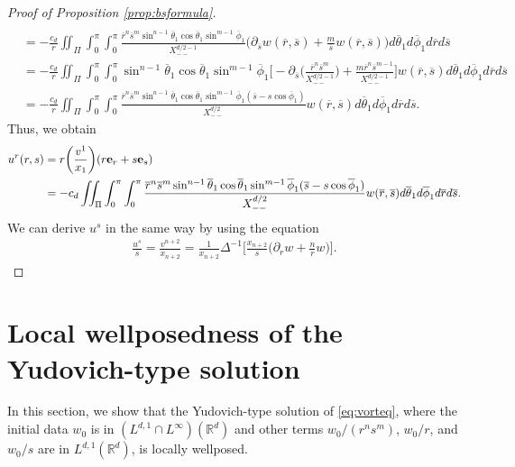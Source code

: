 \documentclass[11pt]{amsart}
\theoremstyle{definition}
\theoremstyle{remark}
\numberwithin{equation}{section}
\numberwithin{equation}{section}
\newcommand{\br}[1]{\overline{#1}}
\newcommand{\lap}{\Delta}
\newcommand{\rd}{\partial}
\newcommand{\0}{\emptyset}
\newcommand{\ift}{\infty}
\newcommand{\tht}{\theta}
\newcommand{\bfe}{{\bf e}}
\newcommand{\bbR}{\mathbb R}
\begin{document}
\begin{proof}[Proof of Proposition \ref{prop:bsformula}]
\begin{equation}
\begin{aligned}
				\\
				&=-\frac{c_{d}}{r}\iint_{\Pi}\int_{0}^{\pi}\int_{0}^{\pi}\frac{\br{r}^{n}\br{s}^{m}\sin^{n-1}\br{\tht}_{1}\cos\br{\tht}_{1}\sin^{m-1}\br{\phi}_{1}%
				}{X_{--}^{d/2-1}}\bigg(\rd_{\br{s}}w(\br{r},\br{s})+\frac{m}{\br{s}}w(\br{r},\br{s})\bigg)d\br{\tht}_{1}d\br{\phi}_{1}d\br{r}d\br{s}\\
				&=-\frac{c_{d}}{r}\iint_{\Pi}\int_{0}^{\pi}\int_{0}^{\pi}\sin^{n-1}\br{\tht}_{1}\cos\br{\tht}_{1}\sin^{m-1}\br{\phi}_{1}%
				\bigg[-\rd_{\br{s}}\bigg(\frac{\br{r}^{n}\br{s}^{m}}{X_{--}^{d/2-1}}\bigg)+\frac{m\br{r}^{n}\br{s}^{m-1}}{X_{--}^{d/2-1}}\bigg]w(\br{r},\br{s})d\br{\tht}_{1}d\br{\phi}_{1}d\br{r}d\br{s}\\
				&=-\frac{c_{d}}{r}\iint_{\Pi}\int_{0}^{\pi}\int_{0}^{\pi}\frac{\br{r}^{n}\br{s}^{m}\sin^{n-1}\br{\tht}_{1}\cos\br{\tht}_{1}\sin^{m-1}\br{\phi}_{1}%
					(\br{s}-s\cos\br{\phi}_{1})}{X_{--}^{d/2}}w(\br{r},\br{s})d\br{\tht}_{1}d\br{\phi}_{1}d\br{r}d\br{s}.
			\end{aligned}
		\end{equation}
		Thus, we obtain
		\begin{equation}
			\begin{aligned}
				u^{r}(r,s)&=r\bigg(\frac{v^{1}}{x_{1}}\bigg)(r\bfe_{r}+s\bfe_{s})%
				\\
				&=-c_{d}\iint_{\Pi}\int_{0}^{\pi}\int_{0}^{\pi}\frac{\br{r}^{n}\br{s}^{m}\sin^{n-1}\br{\tht}_{1}\cos\br{\tht}_{1}\sin^{m-1}\br{\phi}_{1}%
					(\br{s}-s\cos\br{\phi}_{1})}{X_{--}^{d/2}}w(\br{r},\br{s})d\br{\tht}_{1}d\br{\phi}_{1}d\br{r}d\br{s}.
			\end{aligned}
		\end{equation}
	We can derive $u^{s}$ in the same way by using the equation
		\begin{equation}
			\begin{aligned}
				\frac{u^{s}}{s}=\frac{v^{n+2}}{x_{n+2}}=\frac{1}{x_{n+2}}\lap^{-1}\bigg[\frac{x_{n+2}}{s}%
				\bigg(\rd_{r}w+\frac{n}{r}w\bigg)\bigg].%
			\end{aligned}
			\end{equation}
	\end{proof}	
	
	
	\section{Local wellposedness of the Yudovich-type solution}\label{sec:lwp}
In this section, we show that the Yudovich-type solution of \eqref{eq:vorteq}, where the initial data $w_{0}$ is in $(L^{d,1}\cap L^{\ift})(\bbR^{d})$ and other terms $ w_{0}/(r^{n}s^{m}) $, $w_{0}/r$, and $w_{0}/s$ are in $L^{d,1}(\bbR^{d})$, is locally wellposed.
	
\end{document}
